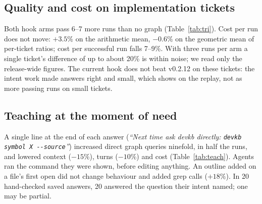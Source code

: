 \documentclass[conference]{IEEEtran}
\begin{document}
\subsection{Quality and cost on implementation tickets}
\begin{table}[t]\centering\small
\caption{24 tickets, 72 runs per arm (Sonnet). Pass = hidden check and suite.}\label{tab:tri}
\end{table}
Both hook arms pass 6--7 more runs than no graph (Table~\ref{tab:tri}). Cost per run does not move: $+3.5\%$ on the
arithmetic mean, $-0.6\%$ on the geometric mean of per-ticket ratios; cost per successful run falls 7--9\%. With three
runs per arm a single ticket's difference of up to about 20\% is within noise; we read only the release-wide figures.
The current hook does not beat v0.2.12 on these tickets: the intent work made answers right and small, which shows on
the replay, not as more passing runs on small tickets.

\subsection{Teaching at the moment of need}\label{sec:teach}
\begin{table}[t]\centering\small
\caption{Last 6 tickets, 18 runs per arm. Ratios vs the hook alone are geometric means over tickets.}\label{tab:teach}
\end{table}
A single line at the end of each answer (\emph{``Next time ask devkb directly: \texttt{devkb symbol X -{}-source}''})
increased direct graph queries ninefold, in half the runs, and lowered context ($-15\%$), turns ($-10\%$) and cost
(Table~\ref{tab:teach}). Agents ran the command they were shown, before editing anything. An outline added on a file's
first open did not change behaviour and added grep calls ($+18\%$). In 20 hand-checked saved answers, 20 answered the
question their intent named; one may be partial.
\end{document}
